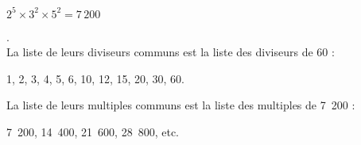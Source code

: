   \centerline {$ 2^5 \times 3^2 \times 5^2 = 7\,200 $}.\\


  La liste de leurs diviseurs communs est la liste des diviseurs de 60 :\\
    \centerline { 1, 2, 3, 4, 5, 6, 10, 12, 15, 20, 30, 60. } 
    
    La liste de leurs multiples communs est la liste des multiples de 7~200 :   \\
   
       \centerline { 7~200, 14~400, 21~600, 28~800, etc.}  





